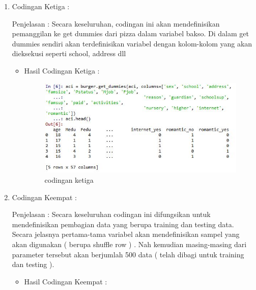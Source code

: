 \begin{enumerate}
\begin{enumerate}
\begin{itemize}
\end{itemize}
\par
\item Codingan Ketiga :
\par Penjelasan : Secara keseluruhan, codingan ini akan  mendefinisikan pemanggilan ke get dummies dari pizza dalam variabel bakso. Di dalam get dummies sendiri akan terdefinisikan variabel  dengan kolom-kolom yang akan dieksekusi seperti school, address dll
\par 
\begin{itemize}
\par
\item Hasil Codingan Ketiga :

\begin{figure}[ht]
\centering
\includegraphics[scale=0.4]{figures/hasil3.jpg}
\caption{codingan ketiga}
\label{contoh}
\end{figure}

\end{itemize}
\par
\item Codingan Keempat :
\par Penjelasan : Secara keseluruhan codingan ini difungsikan untuk mendefinisikan pembagian data yang berupa training dan testing data. Secara jelasnya pertama-tama variabel  akan mendefinisikan sampel yang akan digunakan ( berupa shuffle row ) . Nah kemudian masing-masing dari  parameter tersebut akan berjumlah 500 data ( telah dibagi untuk training dan testing ).
\par 
\begin{itemize}
\par
\item Hasil Codingan Keempat :


\end{itemize}
\end{enumerate}
\end{enumerate}
